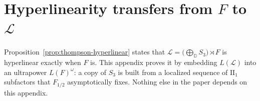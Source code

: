 \section{Hyperlinearity transfers from \texorpdfstring{$F$}{F} to \texorpdfstring{$\mathcal L$}{L}}\label{app:hyperlinear}

Proposition~\ref{prop:thompson-hyperlinear} states that $\mathcal L=\bigl(\bigoplus_{\mathbb D}S_3\bigr)\rtimes F$ is hyperlinear exactly when
$F$ is. This appendix proves it by embedding $L(\mathcal L)$ into an ultrapower $L(F)^\omega$: a copy of $S_3$ is built from a localized
sequence of $\mathrm{II}_1$ subfactors that $F_{1/2}$ asymptotically fixes. Nothing else in the paper depends on this appendix.


